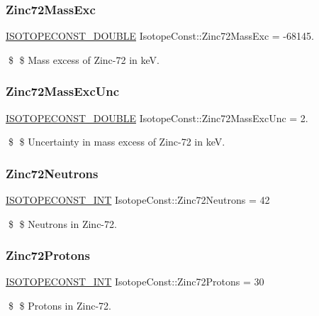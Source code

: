 \subsubsection{\texorpdfstring{Zinc72\+Mass\+Exc}{Zinc72MassExc}}
{\footnotesize\ttfamily \mbox{\hyperlink{group___isotope_const-_macros_ga8f45a7272ce02c0b4c65c44636ed719a}{I\+S\+O\+T\+O\+P\+E\+C\+O\+N\+S\+T\+\_\+\+D\+O\+U\+B\+LE}} Isotope\+Const\+::\+Zinc72\+Mass\+Exc = -\/68145.}

\$ \$ Mass excess of Zinc-\/72 in keV. \mbox{\label{group___isotope_const-_zinc-_zn72_gacc94748358df663d39baa33c4cf189b1}} 
\subsubsection{\texorpdfstring{Zinc72\+Mass\+Exc\+Unc}{Zinc72MassExcUnc}}
{\footnotesize\ttfamily \mbox{\hyperlink{group___isotope_const-_macros_ga8f45a7272ce02c0b4c65c44636ed719a}{I\+S\+O\+T\+O\+P\+E\+C\+O\+N\+S\+T\+\_\+\+D\+O\+U\+B\+LE}} Isotope\+Const\+::\+Zinc72\+Mass\+Exc\+Unc = 2.}

\$ \$ Uncertainty in mass excess of Zinc-\/72 in keV. \mbox{\label{group___isotope_const-_zinc-_zn72_ga602f6971a2724862ce7719513f9646bb}} 
\subsubsection{\texorpdfstring{Zinc72\+Neutrons}{Zinc72Neutrons}}
{\footnotesize\ttfamily \mbox{\hyperlink{group___isotope_const-_macros_ga5f18360b3e99483a35c32d789e62621c}{I\+S\+O\+T\+O\+P\+E\+C\+O\+N\+S\+T\+\_\+\+I\+NT}} Isotope\+Const\+::\+Zinc72\+Neutrons = 42}

\$ \$ Neutrons in Zinc-\/72. \mbox{\label{group___isotope_const-_zinc-_zn72_gac96ebfdb2780202234dd0709aacc2e2b}} 
\subsubsection{\texorpdfstring{Zinc72\+Protons}{Zinc72Protons}}
{\footnotesize\ttfamily \mbox{\hyperlink{group___isotope_const-_macros_ga5f18360b3e99483a35c32d789e62621c}{I\+S\+O\+T\+O\+P\+E\+C\+O\+N\+S\+T\+\_\+\+I\+NT}} Isotope\+Const\+::\+Zinc72\+Protons = 30}

\$ \$ Protons in Zinc-\/72. 